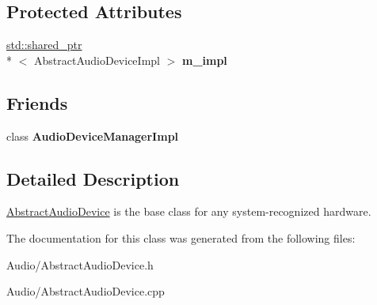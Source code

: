 \subsection*{Protected Attributes}
\begin{DoxyCompactItemize}
\item 
\hypertarget{class_d_x_1_1_audio_1_1_abstract_audio_device_a5cf5daa514cf4bb7baa2d7ddbd63af5a}{\hyperlink{classstd_1_1shared__ptr}{std\-::shared\-\_\-ptr}\\*
$<$ Abstract\-Audio\-Device\-Impl $>$ {\bfseries m\-\_\-impl}}\label{class_d_x_1_1_audio_1_1_abstract_audio_device_a5cf5daa514cf4bb7baa2d7ddbd63af5a}

\end{DoxyCompactItemize}
\subsection*{Friends}
\begin{DoxyCompactItemize}
\item 
\hypertarget{class_d_x_1_1_audio_1_1_abstract_audio_device_a04f96566766f09f439a3a13c5fcbe408}{class {\bfseries Audio\-Device\-Manager\-Impl}}\label{class_d_x_1_1_audio_1_1_abstract_audio_device_a04f96566766f09f439a3a13c5fcbe408}

\end{DoxyCompactItemize}


\subsection{Detailed Description}
\hyperlink{class_d_x_1_1_audio_1_1_abstract_audio_device}{Abstract\-Audio\-Device} is the base class for any system-\/recognized hardware. 

The documentation for this class was generated from the following files\-:\begin{DoxyCompactItemize}
\item 
Audio/Abstract\-Audio\-Device.\-h\item 
Audio/Abstract\-Audio\-Device.\-cpp\end{DoxyCompactItemize}
